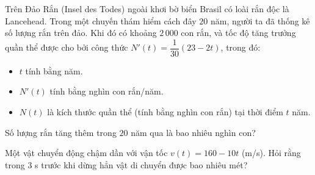 \begin{bt}%
	Trên Đảo Rắn (Insel des Todes) ngoài khơi bờ biển Brasil có loài rắn độc là Lancehead. Trong một chuyến thám hiểm cách đây $20$ năm,  người ta đã thống kê số lượng rắn trên đảo. Khi đó có khoảng $2\,000$ con rắn, và tốc độ tăng trưởng quần thể được cho bởi công thức $N' (t)=\dfrac{1}{30}(23-2t)$, trong đó:
	\begin{itemize}
		\item $t$ tính bằng năm. 
		\item $N' (t)$  tính bằng nghìn con rắn/năm.
		\item $N(t)$ là kích  thước quần thể (tính bằng nghìn con rắn) tại thời điểm $t$ năm.
	\end{itemize}
	Số lượng rắn tăng thêm  trong $20$ năm qua là bao nhiêu nghìn con?
\end{bt}

\begin{bt}%
	 Một vật chuyển động chậm dần với vận tốc $v(t)=160-10t$ (m/s). Hỏi rằng trong $3$ s trước khi dừng hẳn vật di chuyển được bao nhiêu mét?
\end{bt}


